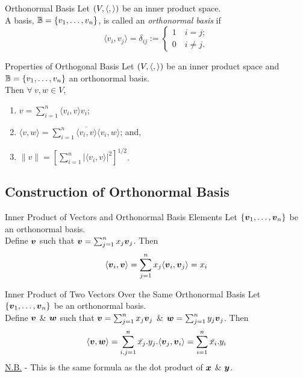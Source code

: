 \documentclass[11pt,a4paper]{article}
\begin{document}
\subtitle{Definition 9.08 - }{Orthonormal Basis}
Let $(V, \langle , \rangle)$ be an inner product space.\\
A basis, $\mathbb{B} = \{ v_1 , \dots , v_n\}$, is called an \textit{orthonormal basis} if
$$\langle v_i , v_j \rangle = \delta_{ij} := \begin{cases} 1 \quad i = j;\\ 0 \quad i \not = j. \end{cases}$$

\subtitle{Theorem 9.09 - }{Properties of Orthogonal Basis}
Let $(V, \langle , \rangle)$ be an inner product space and $\mathbb{B} = \{ v_1 , \dots , v_n\}$ an orthonormal basis.\\
Then $\forall\ v, w \in V$,
\begin{enumerate}[label=\roman*)]
  \item $v = \sum_{i=1}^n \langle v_i , v \rangle v_i$;
  \item $\langle v , w \rangle = \sum_{i=1}^n \overline{\langle v_i, v \rangle}\langle v_i, w \rangle$; and,
  \item $\|v\| = \left[\sum_{i=1}^n |\langle v_i, v \rangle|^2\right]^{1/2} $.
\end{enumerate}

\subsection{Construction of Orthonormal Basis}

\subtitle{Theorem 9.10 - }{Inner Product of Vectors and Orthonormal Basis Elements}
Let $\{\boldsymbol{v}_1, \dots , \boldsymbol{v}_n\}$ be an orthonormal basis.\\
Define $\boldsymbol{v}$ such that $\boldsymbol{v} = \sum_{j=1}^n x_j \boldsymbol{v}_j$. Then\\
$$\langle\boldsymbol{v}_i, \boldsymbol{v}\rangle = \sum_{j=1}^n x_j \langle\boldsymbol{v}_i, \boldsymbol{v}_j \rangle = x_i$$

\subtitle{Theorem 9.11 - }{Inner Product of Two Vectors Over the Same Orthonormal Basis}
Let $\{\boldsymbol{v}_1, \dots , \boldsymbol{v}_n\}$ be an orthonormal basis.\\
Define $\boldsymbol{v}$ \& $\boldsymbol{w}$ such that $\boldsymbol{v} = \sum_{j=1}^n x_j \boldsymbol{v}_j$ \& $\boldsymbol{w} = \sum_{j=1}^n y_j \boldsymbol{v}_j$. Then\\
$$\langle \boldsymbol{v}, \boldsymbol{w} \rangle = \sum_{i,j=1}^n \bar{x_j}.y_j.\langle \boldsymbol{v}_j, \boldsymbol{v}_i \rangle = \sum_{i=1}^n \bar{x_i}.y_i$$
\underline{N.B.} - This is the same formula as the dot product of $\boldsymbol{x}$ \& $\boldsymbol{y}$.\\
\end{document}
